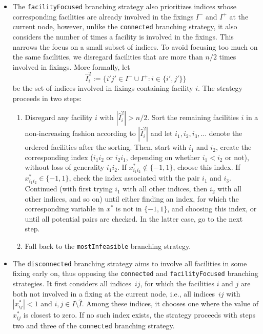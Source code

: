 \documentclass{article}
\begin{document}
\begin{itemize}
    \item The \texttt{facilityFocused} branching strategy also prioritizes indices whose corresponding facilities are already involved in the fixings $I^-$ and $I^+$ at the current node, however, unlike the \texttt{connected} branching strategy, it also considers the number of times a facility is involved in the fixings. This narrows the focus on a small subset of indices. To avoid focusing too much on the same facilities, we disregard facilities that are more than $n/2$ times involved in fixings. More formally, let
    \[
        \hat{I}^2_i := \{i'j' \in I^- \cup I^+: i \in \{i', j'\}\}
    \]
    be the set of indices involved in fixings containing facility $i$. The strategy proceeds in two steps:
    \begin{enumerate}
    \item Disregard any facility $i$ with $|\hat{I}^2_i|>n/2$. Sort the remaining facilities $i$ in a non-increasing fashion according to $|\hat{I}^2_i|$ and let $i_1, i_2, i_3, \ldots$ denote the ordered facilities after the sorting. Then, start with $i_1$ and $i_2$, create the corresponding index ($i_1i_2$ or $i_2i_1$, depending on whether $i_1<i_2$ or not), without loss of generality $i_1i_2$. If $x^*_{i_1i_2} \notin \{-1,1\}$, choose this index. If $x^*_{i_1i_2}\in \{-1,1\}$, check the index associated with the pair $i_1$ and $i_3$. Continued (with first trying $i_1$ with all other indices, then $i_2$ with all other indices, and so on) until either finding an index, for which the corresponding variable in $x^*$ is not in $\{-1,1\}$, and choosing this index, or until all potential pairs are checked. In the latter case, go to the next step.

    \item Fall back to the \texttt{mostInfeasible} branching strategy.
    \end{enumerate}     

    \item The \texttt{disconnected} branching strategy aims to involve all facilities in some fixing early on, thus opposing the \texttt{connected} and \texttt{facilityFocused} branching strategies. It first considers all indices~$ij$, for which the facilities $i$ and $j$ are both not involved in a fixing at the current node, i.e., all indices~$ij$ with $|x^*_{ij}|<1$ and $i,j \in I \setminus \hat{I}$. Among these indices, it chooses one where the value of $x^*_{ij}$ is closest to zero. If no such index exists, the strategy proceeds with steps two and three of the \texttt{connected} branching strategy.
    
\end{itemize}
\end{document}
